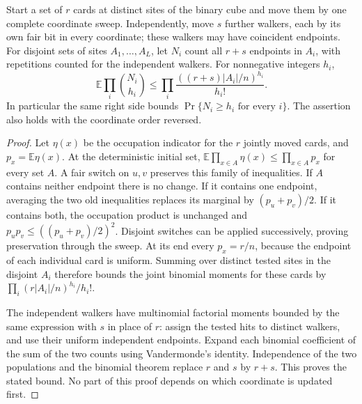 \begin{lemma}
\label{grid:occupation}
Start a set of $r$ cards at distinct sites of the binary cube and move
them by one complete coordinate sweep. Independently, move $s$ further
walkers, each by its own fair bit in every coordinate; these walkers
may have coincident endpoints. For disjoint sets of sites
$A_1,\ldots,A_L$, let $N_i$ count all $r+s$ endpoints in $A_i$, with
repetitions counted for the independent walkers. For nonnegative
integers $h_i$,
\[
 \mathbb E\prod_i\binom{N_i}{h_i}
 \le\prod_i\frac{((r+s)|A_i|/n)^{h_i}}{h_i!}.
\]
In particular the same right side bounds
$\Pr\{N_i\ge h_i\text{ for every }i\}$. The assertion also holds
with the coordinate order reversed.
\end{lemma}
\begin{proof}
Let $\eta(x)$ be the occupation indicator for the $r$ jointly moved
cards, and $p_x=\mathbb E\eta(x)$. At the deterministic initial set,
$\mathbb E\prod_{x\in A}\eta(x)\le\prod_{x\in A}p_x$ for every set
$A$. A fair switch on $u,v$ preserves this family of inequalities.
If $A$ contains neither endpoint there is no change. If it contains
one endpoint, averaging the two old inequalities replaces its marginal
by $(p_u+p_v)/2$. If it contains both, the occupation product is
unchanged and $p_up_v\le((p_u+p_v)/2)^2$. Disjoint switches can be
applied successively, proving preservation through the sweep. At its
end every $p_x=r/n$, because the endpoint of each individual card is
uniform. Summing over distinct tested sites in the disjoint $A_i$
therefore bounds the joint binomial moments for these cards by
$\prod_i(r|A_i|/n)^{h_i}/h_i!$.

The independent walkers have multinomial factorial moments bounded
by the same expression with $s$ in place of $r$: assign the tested
hits to distinct walkers, and use their uniform independent endpoints.
Expand each binomial coefficient of the sum of the two counts using
Vandermonde's identity. Independence of the two populations and the
binomial theorem replace $r$ and $s$ by $r+s$. This proves the stated
bound. No part of this proof depends on which coordinate is updated
first.
\end{proof}


